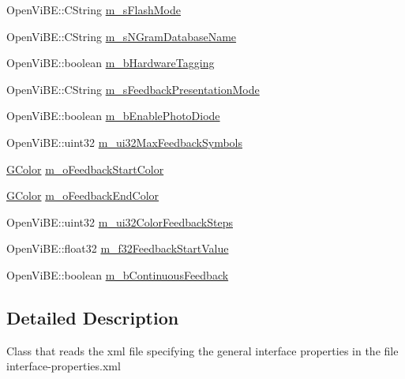 \begin{DoxyCompactItemize}
\item 
OpenViBE::CString \hyperlink{classOpenViBEApplications_1_1P300InterfacePropertyReader_acad6f482b3aa6dc937e20fd6033cb835}{m\_\-sFlashMode}
\item 
OpenViBE::CString \hyperlink{classOpenViBEApplications_1_1P300InterfacePropertyReader_a9346c9e396ca23d2d7961a500b8e946c}{m\_\-sNGramDatabaseName}
\item 
OpenViBE::boolean \hyperlink{classOpenViBEApplications_1_1P300InterfacePropertyReader_a6fb9f118aa3aba172b502cce6b84a4d4}{m\_\-bHardwareTagging}
\item 
OpenViBE::CString \hyperlink{classOpenViBEApplications_1_1P300InterfacePropertyReader_a11f51c5081a3565d2086194d15a107a5}{m\_\-sFeedbackPresentationMode}
\item 
OpenViBE::boolean \hyperlink{classOpenViBEApplications_1_1P300InterfacePropertyReader_a65a89b189d0e1bf35240e69d90b36de0}{m\_\-bEnablePhotoDiode}
\item 
OpenViBE::uint32 \hyperlink{classOpenViBEApplications_1_1P300InterfacePropertyReader_ab4c591e47a187c3e12043ff580f159d2}{m\_\-ui32MaxFeedbackSymbols}
\item 
\hyperlink{structOpenViBEApplications_1_1GColor}{GColor} \hyperlink{classOpenViBEApplications_1_1P300InterfacePropertyReader_a88a3427baf86d15a173e71c993eb9c33}{m\_\-oFeedbackStartColor}
\item 
\hyperlink{structOpenViBEApplications_1_1GColor}{GColor} \hyperlink{classOpenViBEApplications_1_1P300InterfacePropertyReader_a00386af060822a4fef972a2c301a16b2}{m\_\-oFeedbackEndColor}
\item 
OpenViBE::uint32 \hyperlink{classOpenViBEApplications_1_1P300InterfacePropertyReader_abf38fe548ff9a5746b3b491b8dcf9773}{m\_\-ui32ColorFeedbackSteps}
\item 
OpenViBE::float32 \hyperlink{classOpenViBEApplications_1_1P300InterfacePropertyReader_a9b29f6a98940b1b23704af834e6ee932}{m\_\-f32FeedbackStartValue}
\item 
OpenViBE::boolean \hyperlink{classOpenViBEApplications_1_1P300InterfacePropertyReader_a0abd4ae713f08368dd6b1e3b10733822}{m\_\-bContinuousFeedback}
\end{DoxyCompactItemize}


\subsection{Detailed Description}
Class that reads the xml file specifying the general interface properties in the file interface-\/properties.xml 


